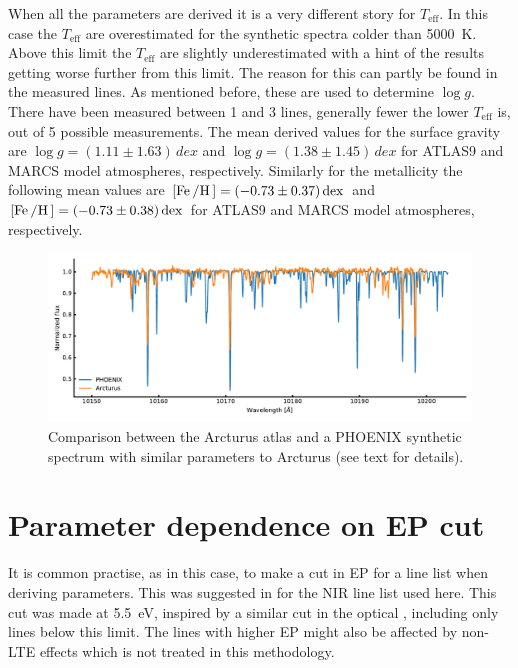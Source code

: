 When all the parameters are derived it is a very different story for $T_\mathrm{eff}$. In this case
the $T_\mathrm{eff}$ are overestimated for the synthetic spectra colder than \SI{5000}{K}. Above
this limit the $T_\mathrm{eff}$ are slightly underestimated with a hint of the results getting worse
further from this limit. The reason for this can partly be found in the measured  lines.
As mentioned before, these are used to determine $\log g$. There have been measured between 1 and 3
 lines, generally fewer the lower $T_\mathrm{eff}$ is, out of 5 possible measurements.
The mean derived values for the surface gravity are $\log g=(1.11\pm1.63)\,\si{dex}$ and $\log
g=(1.38\pm1.45)\,\si{dex}$ for ATLAS9 and MARCS model atmospheres, respectively. Similarly for the
metallicity the following mean values are $[\ion{Fe}/\ion{H}]=\SI{-0.73(37)}{dex}$ and
$[\ion{Fe}/\ion{H}]=\SI{-0.73(38)}{dex}$ for ATLAS9 and MARCS model atmospheres, respectively.

\begin{figure}[htpb!]
    \centering
    \includegraphics[width=1.0\linewidth]{figures/arcturus_phoenix.pdf}
    \caption{Comparison between the Arcturus atlas and a PHOENIX synthetic spectrum with similar
             parameters to Arcturus (see text for details).}
    \label{fig:arcturus_phoenix}
\end{figure}



\section{Parameter dependence on EP cut}
\label{sec:EPcut}

It is common practise, as in this case, to make a cut in EP for a line list when deriving
parameters. This was suggested in \citet{Andreasen2016} \citep[later done in][]{Andreasen2017b} for
the NIR line list used here. This cut was made at \SI{5.5}{eV}, inspired by a similar cut in the
optical \citep{Sousa2008a}, including only lines below this limit. The lines with higher EP might
also be affected by non-LTE effects which is not treated in this methodology.


